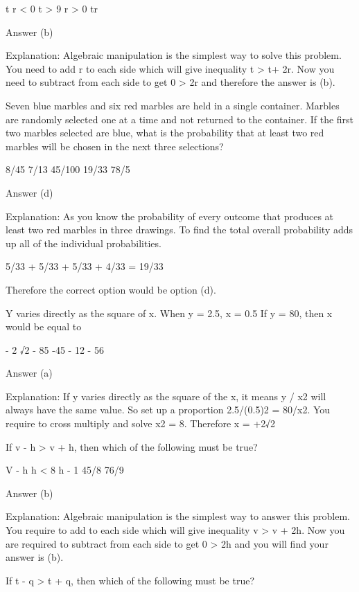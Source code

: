         t
        r < 0
        t > 9
        r > 0
        tr 

    Answer (b)

    Explanation: Algebraic manipulation is the simplest way to solve this problem. You need to add r to each side which will give inequality t > t+ 2r. Now you need to subtract from each side to get 0 > 2r and therefore the answer is (b). 




    Seven blue marbles and six red marbles are held in a single container. Marbles are randomly selected one at a time and not returned to the container. If the first two marbles selected are blue, what is the probability that at least two red marbles will be chosen in the next three selections?

        8/45
        7/13
        45/100
        19/33
        78/5 

    Answer (d)

    Explanation: As you know the probability of every outcome that produces at least two red marbles in three drawings. To find the total overall probability adds up all of the individual probabilities.

    5/33 + 5/33 + 5/33 + 4/33 = 19/33

    Therefore the correct option would be option (d).

    Y varies directly as the square of x. When y = 2.5, x = 0.5 If y = 80, then x would be equal to

        - 2 √2
        - 85
        -45
        - 12
        - 56 

    Answer (a)

    Explanation: If y varies directly as the square of the x, it means y / x2 will always have the same value. So set up a proportion 2.5/(0.5)2 = 80/x2. You require to cross multiply and solve x2 = 8. Therefore x = +2√2

    If v - h > v + h, then which of the following must be true?

        V - h
        h < 8
        h - 1
        45/8
        76/9 

    Answer (b)

    Explanation: Algebraic manipulation is the simplest way to answer this problem. You require to add to each side which will give inequality v > v + 2h. Now you are required to subtract from each side to get 0 > 2h and you will find your answer is (b).

    If t - q > t + q, then which of the following must be true?

